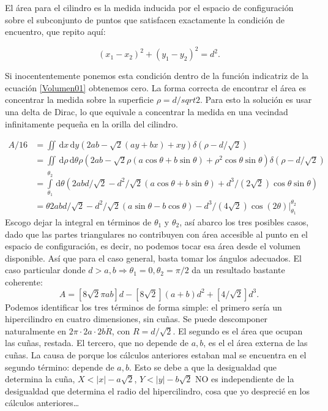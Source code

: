 \documentclass[a4paper,10pt]{article}
\newcommand{\rd}{\, \mathrm{d}}
\begin{document}
El área para el cilindro es la medida inducida por el espacio de
configuración sobre el subconjunto de puntos que satisfacen 
exactamente la condición de encuentro, que repito aquí:

\begin{equation}
(x_1-x_2)^2+(y_1-y_2)^2=d^2.
\end{equation}

Si inocententemente ponemos esta condición dentro de la función
indicatriz de la ecuación \ref{Volumen01} obtenemos cero. La forma correcta
de encontrar el área es concentrar la medida sobre la superficie
$\rho=d/sqrt{2}$. Para esto la solución es usar una delta de Dirac, lo
que equivale a concentrar la medida en una vecindad
infinitamente pequeña en la orilla del cilindro.

\begin{equation}\label{Volumen01}
\begin{split}
A/16 
&=\iint \rd x \rd y (2ab-\sqrt{2}(ay+bx)+x y)
\delta (\rho-d/\sqrt{2}) \\
&=\iint \rd \rho \rd \theta \rho (2ab
-\sqrt{2}\rho(a \cos\theta + b\sin\theta )+\rho^2 \cos\theta\sin\theta)
\delta (\rho-d/\sqrt{2})\\
&=\int\limits_{\theta_1}^{\theta_2} \rd \theta (2ab d/\sqrt{2}
-d^2/\sqrt{2}(a \cos\theta + b\sin\theta )+d^3/(2\sqrt{2}) \cos\theta\sin\theta)\\
&= \theta 2ab d/\sqrt{2}
-d^2/\sqrt{2}(a\sin\theta - b\cos\theta )-d^3/(4\sqrt{2}) \cos (2\theta) 
\bigg\vert_{\theta_1}^{\theta_2}
\end{split}
\end{equation}
Escogo dejar la integral en términos de $\theta_1$ y $\theta_2$,
así abarco los tres posibles casos, dado que las partes triangulares
no contribuyen con área accesible al punto en el espacio de configuración,
es decir, no podemos tocar esa área desde el volumen disponible.
Así que para el caso general, basta tomar los ángulos adecuados.
El caso particular donde 
$d>a,b\Rightarrow \theta_1=0, \theta_2=\pi/2$ 
da un resultado bastante coherente:
\begin{equation}\label{areachoque}
A=[8\sqrt{2}\pi ab] d -[8\sqrt{2}] (a+b) d^2 +[4 /\sqrt{2}]d^3.
\end{equation}
Podemos identificar los tres términos de forma simple:
el primero sería un hipercilindro en cuatro dimensiones, sin cuñas.
Se puede descomponer naturalmente en 
$2\pi \cdot 2a \cdot 2b \dot R$, con $R=d/\sqrt{2}$.
El segundo es el área que ocupan las cuñas, restada. El tercero,
que no depende de $a, b$, es el el área 
externa de las cuñas. La causa de  porque
los cálculos anteriores estaban mal se encuentra en el segundo término:
depende de $a,b$. Esto se debe a que la desigualdad que determina
la cuña,  $X<|x|-a\sqrt{2}$, $Y<|y|-b\sqrt{2}$ NO es independiente de
la desigualdad que determina el radio del hipercilindro, cosa que yo
desprecié en los cálculos anteriores\ldots
\end{document}
